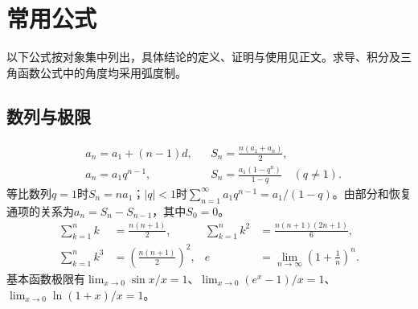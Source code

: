 \chapter{常用公式}
\label{app:formulas}

\begingroup
\fontsize{12pt}{20pt}\selectfont
\setlength{\parskip}{4pt}
\setlength{\abovedisplayskip}{7pt}
\setlength{\belowdisplayskip}{7pt}
\setlength{\abovedisplayshortskip}{4pt}
\setlength{\belowdisplayshortskip}{4pt}
\setlength{\LTpre}{6pt}
\setlength{\LTpost}{6pt}
\setlength{\jot}{1pt}

以下公式按对象集中列出，具体结论的定义、证明与使用见正文。求导、积分及三角函数公式中的角度均采用弧度制。

\section{数列与极限}
\begin{equation*}
 \begin{aligned}
 &a_n=a_1+(n-1)d,&
 &S_n=\frac{n(a_1+a_n)}2,\\
 &a_n=a_1q^{n-1},&
 &S_n=\frac{a_1(1-q^n)}{1-q}\quad(q\ne1).
 \end{aligned}
\end{equation*}
等比数列\(q=1\)时\(S_n=na_1\)；\(|q|<1\)时\(\sum_{n=1}^\infty a_1q^{n-1}=a_1/(1-q)\)。由部分和恢复通项的关系为\(a_n=S_n-S_{n-1}\)，其中\(S_0=0\)。
\begin{equation*}
 \begin{aligned}
 \sum_{k=1}^n k&=\frac{n(n+1)}2,&
 \sum_{k=1}^n k^2&=\frac{n(n+1)(2n+1)}6,\\
 \sum_{k=1}^n k^3&=\left(\frac{n(n+1)}2\right)^2,&
 e&=\lim_{n\to\infty}\left(1+\frac1n\right)^n.
 \end{aligned}
\end{equation*}
基本函数极限有\(\lim_{x\to0}\sin x/x=1\)、\(\lim_{x\to0}(e^x-1)/x=1\)、\(\lim_{x\to0}\ln(1+x)/x=1\)。

